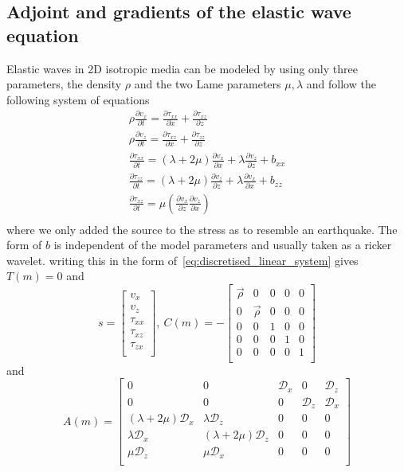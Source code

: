 \documentclass[fleqn,11pt]{SelfArx} %
\newcommand{\pder}[2][]{\frac{\partial#1}{\partial#2}}
\theoremstyle{definition}
\begin{document}
\subsection{Adjoint and gradients of the elastic wave equation}
Elastic waves in 2D isotropic media can be modeled by using only three parameters, the density $\rho$ and the two Lame parameters $\mu, \lambda$ and follow the following system of equations
\begin{equation}\label{eq:elastic_system}
\begin{aligned}
\rho \pder[v_x]{t} = \pder[\tau_{xx}]{x} + \pder[\tau_{xz}]{z} \\
\rho \pder[v_z]{t} = \pder[\tau_{xz}]{x} + \pder[\tau_{zz}]{z} \\
\pder[\tau_{xx}]{t} = \left(\lambda + 2\mu\right) \pder[v_x]{x} + \lambda \pder[v_z]{z} + b_{xx} \\
\pder[\tau_{zz}]{t} = \left(\lambda + 2\mu\right) \pder[v_z]{z} + \lambda \pder[v_x]{x} + b_{zz} \\
\pder[\tau_{xz}]{t} = \mu\left( \pder[v_x]{z} \pder[v_z]{x}\right) \\
\end{aligned}
\end{equation} 
where we only added the source to the stress as to resemble an earthquake. The form of $b$ is independent of the model parameters and usually taken as a ricker wavelet. 
writing this in the form of~\cref{eq:discretised_linear_system} gives $T(m) = 0$ and 
\begin{equation}s = 
\begin{bmatrix}
v_x \\
v_z \\
\tau_{xx}\\
\tau_{xz} \\
\tau_{zx} \\
\end{bmatrix},\ C\left(m\right) = -
\begin{bmatrix}
\vec \rho & 0 & 0 & 0 & 0 \\
0 & \vec \rho & 0 & 0 & 0 \\
0 & 0 & 1 & 0 & 0 \\
0 & 0 & 0 & 1 & 0 \\
0 & 0 & 0 & 0 & 1 \\
\end{bmatrix}
\end{equation}
and 
\begin{equation}
A\left(m\right) = 
\begin{bmatrix}
0 & 0 & \mathcal{D}_x & 0 & \mathcal{D}_z \\
0 & 0 & 0 & \mathcal{D}_z & \mathcal{D}_x \\
\left(\lambda + 2\mu\right)\mathcal{D}_x & \lambda \mathcal{D}_z & 0 & 0 & 0 \\
\lambda \mathcal{D}_x & \left(\lambda + 2\mu\right) \mathcal{D}_z & 0 & 0 & 0 \\
\mu \mathcal{D}_z & \mu \mathcal{D}_x & 0 & 0 & 0 \\
\end{bmatrix}
\end{equation}
\end{document}

